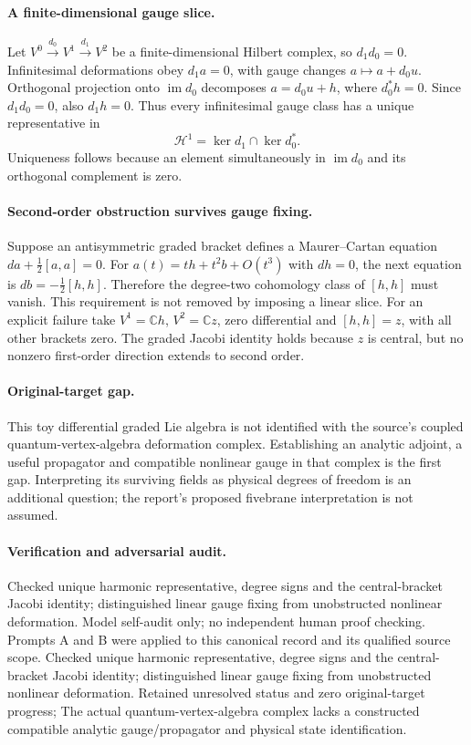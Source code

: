 \documentclass[11pt]{article}
\begin{document}
\paragraph{A finite-dimensional gauge slice.} Let $V^0\xrightarrow{d_0}V^1\xrightarrow{d_1}V^2$ be a finite-dimensional Hilbert complex, so $d_1d_0=0$. Infinitesimal deformations obey $d_1a=0$, with gauge changes $a\mapsto a+d_0u$. Orthogonal projection onto $\operatorname{im}d_0$ decomposes $a=d_0u+h$, where $d_0^*h=0$. Since $d_1d_0=0$, also $d_1h=0$. Thus every infinitesimal gauge class has a unique representative in
\[
 \mathcal H^1=\ker d_1\cap\ker d_0^*.
\]
Uniqueness follows because an element simultaneously in $\operatorname{im}d_0$ and its orthogonal complement is zero.

\paragraph{Second-order obstruction survives gauge fixing.} Suppose an antisymmetric graded bracket defines a Maurer--Cartan equation $da+\tfrac12[a,a]=0$. For $a(t)=th+t^2b+O(t^3)$ with $dh=0$, the next equation is $db=-\tfrac12[h,h]$. Therefore the degree-two cohomology class of $[h,h]$ must vanish. This requirement is not removed by imposing a linear slice. For an explicit failure take $V^1=\mathbb C h$, $V^2=\mathbb C z$, zero differential and $[h,h]=z$, with all other brackets zero. The graded Jacobi identity holds because $z$ is central, but no nonzero first-order direction extends to second order.

\paragraph{Original-target gap.} This toy differential graded Lie algebra is not identified with the source's coupled quantum-vertex-algebra deformation complex. Establishing an analytic adjoint, a useful propagator and compatible nonlinear gauge in that complex is the first gap. Interpreting its surviving fields as physical degrees of freedom is an additional question; the report's proposed fivebrane interpretation is not assumed.

\paragraph{Verification and adversarial audit.}
Checked unique harmonic representative, degree signs and the central-bracket Jacobi identity; distinguished linear gauge fixing from unobstructed nonlinear deformation. Model self-audit only; no independent human proof checking. Prompts A and B were applied to this canonical record and its qualified source scope. Checked unique harmonic representative, degree signs and the central-bracket Jacobi identity; distinguished linear gauge fixing from unobstructed nonlinear deformation. Retained unresolved status and zero original-target progress; The actual quantum-vertex-algebra complex lacks a constructed compatible analytic gauge/propagator and physical state identification.
\end{document}
